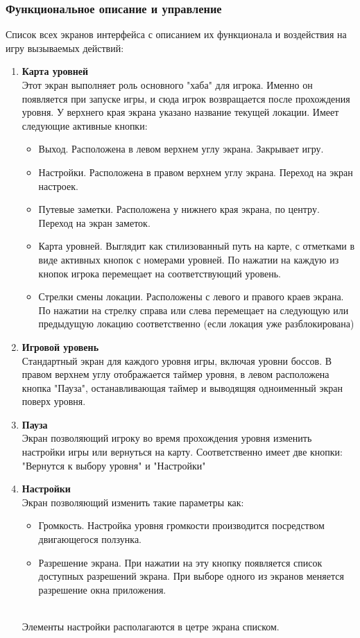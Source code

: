 \documentclass{article}
\begin{document}
\subsubsection{Функциональное описание и управление}
Список всех экранов интерфейса с описанием их функционала и воздействия на игру вызываемых действий:
\begin{enumerate}
    \item \textbf{Карта уровней} 
    \\Этот экран выполняет роль основного "хаба" для игрока. Именно он появляется при запуске игры, и сюда игрок возвращается после прохождения уровня. У верхнего края экрана указано название текущей локации. Имеет следующие активные кнопки:
    \begin{itemize}
        \item Выход. Расположена в левом верхнем углу экрана. Закрывает игру.
        \item Настройки. Расположена в правом верхнем углу экрана. Переход на экран настроек.
        \item Путевые заметки. Расположена у нижнего края экрана, по центру. Переход на экран заметок.
        \item Карта уровней. Выглядит как стилизованный путь на карте, с отметками в виде активных кнопок с номерами уровней. По нажатии на каждую из кнопок игрока перемещает на соответствующий уровень.
        \item Стрелки смены локации. Расположены с левого и правого краев экрана. По нажатии на стрелку справа или слева перемещает на следующую или предыдущую локацию соответственно (если локация уже разблокирована)
    \end{itemize}

    \item \textbf{Игровой уровень}
    \\Стандартный экран для каждого уровня игры, включая уровни боссов. В правом верхнем углу отображается таймер уровня, в левом расположена кнопка "Пауза", останавливающая таймер и выводящяя одноименный экран поверх уровня.

    \item \textbf{Пауза}
    \\Экран позволяющий игроку во время прохождения уровня изменить настройки игры или вернуться на карту. Соответственно имеет две кнопки: "Вернутся к выбору уровня" и "Настройки"

    \item \textbf{Настройки}
    \\Экран позволяющий изменить такие параметры как:
    \begin{itemize}
        \item Громкость. Настройка уровня громкости производится посредством двигающегося ползунка.
        \item Разрешение экрана. При нажатии на эту кнопку появляется список доступных разрешений экрана. При выборе одного из экранов меняется разрешение окна приложения.
    \end{itemize}
    \\Элементы настройки располагаются в цетре экрана списком.
    

\end{enumerate}
\end{document}
